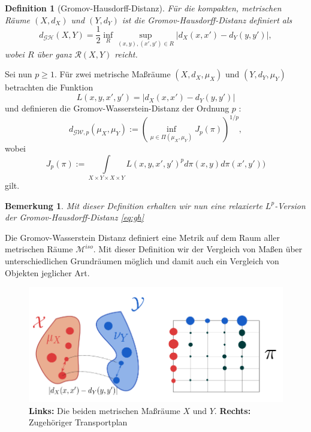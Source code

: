 \documentclass[11pt,a4paper]{article}
\def\emph#1{\textit{#1}}
\newtheorem{definition}[theorem]{Definition}
\newtheorem{remark}[theorem]{Bemerkung}
\numberwithin{equation}{section}
\begin{document}
	\begin{definition}[Gromov-Hausdorff-Distanz]
		Für die kompakten, metrischen Räume $(X,d_X)$ und $(Y,d_Y)$ ist die \emph{Gromov-Hausdorff-Distanz} definiert als
		\begin{equation}
		d_{\mathcal{G}\mathcal{H}}(X,Y) = \frac{1}{2}\inf_{R} \sup_{(x,y),(x',y') \in R}{|d_X(x,x')- d_Y(y,y')|}, \label{eq:gh}
		\end{equation}
		wobei $R$ über ganz $\mathcal{R}(X,Y)$ reicht.
	\end{definition}
	
	Sei nun $p\geq 1$. Für zwei metrische Maßräume $(X,d_X,\mu_X)$ und $(Y,d_Y,\mu_Y)$ betrachten die Funktion 
	\begin{equation}
	L(x,y,x',y') = |d_X(x,x') - d_Y(y,y')|
	\end{equation}
	und definieren die Gromov-Wasserstein-Distanz der Ordnung $p$ \cite{memoli2011gromov}:
	\begin{equation}
	d_{\mathcal{GW},p}(\mu_X,\mu_Y):=\left(\inf_{\mu \in \Pi(\mu_X, \mu_Y)} {J_p(\pi)}\right)^{1/p},
	\end{equation}
	wobei
	\begin{equation}
	J_p(\pi) := \int\limits_{X\times Y \times  X\times Y}{L(x,y,x',y')^pd\pi(x,y)d\pi(x',y'))}
	\end{equation}
	gilt.
	
	\begin{remark}
		Mit dieser Definition erhalten wir nun eine relaxierte $L^p$-Version der Gromov-Hausdorff-Distanz \autoref{eq:gh}
	\end{remark}
	Die Gromov-Wasserstein Distanz definiert eine Metrik auf dem Raum aller metrischen Räume $\mathcal{M}^{iso}$. 
	Mit dieser Definition wir der Vergleich von Maßen über unterschiedlichen Grundräumen möglich und damit auch ein Vergleich von Objekten jeglicher Art.
	
	\begin{figure}[h]
		\begin{center}
			\includegraphics[width=0.3\textheight]{gwd_Transportplan.png}
			\caption[Beispiel der Gromov-Wasserstein-Distanz]{\textbf{Links:} Die beiden metrischen Maßräume $X$ und $Y$. \textbf{Rechts:} Zugehöriger Transportplan}
		\end{center}
	\end{figure}
	
\end{document}
